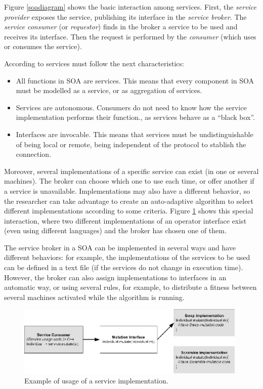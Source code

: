 Figure \ref{soadiagram} shows the basic interaction among
services. First, the {\em service provider} exposes the service, publishing
its interface in the {\em service broker}. The {\em service consumer} (or
{\em requestor}) finds in the broker a service to be used and receives its
interface. Then the request is performed by the {\em consumer} (which uses or
consumes the service).  

According to  \cite{Channabasavaiah2003migrating} services must follow the next characteristics:

\begin{itemize}
\item All functions in SOA are services. This means that every component in SOA must be modelled as a service, or as aggregation of services. 
\item Services are autonomous. Consumers do not need to know how the service implementation performs their function., as services behave as a ``black box''.
\item Interfaces are invocable. This means that services must be undistinguishable of being local or remote, being independent of the protocol to stablish the connection.
\end{itemize}

Moreover, several implementations of a specific service  can exist (in one or several machines). The broker can choose which one to use  each time, or offer another if a service is unavailable. Implementations  may also have a different behavior, so the researcher can take advantage to create an auto-adaptive algorithm to select different implementations according to some criteria. Figure \ref{fig:servicebasic} shows this special interaction, where two different implementations of an operator interface exist (even using different languages) and the broker has chosen one of them.


The service broker in a SOA can be implemented in several ways and have
different behaviors: for example, the implementations of the services to be used can be
defined in a text file (if the services do not change in execution
time). However, the broker can also assign implementations to
interfaces in an automatic way, or using several rules, for example,
to distribute a fitness between several machines activated while the
algorithm is running. 


\begin{figure}
\centering
\includegraphics[width=26pc]{gfx/soa/serviceEA.jpg}
\caption{Example of usage of a service implementation.}
\label{fig:servicebasic}
\end{figure}




